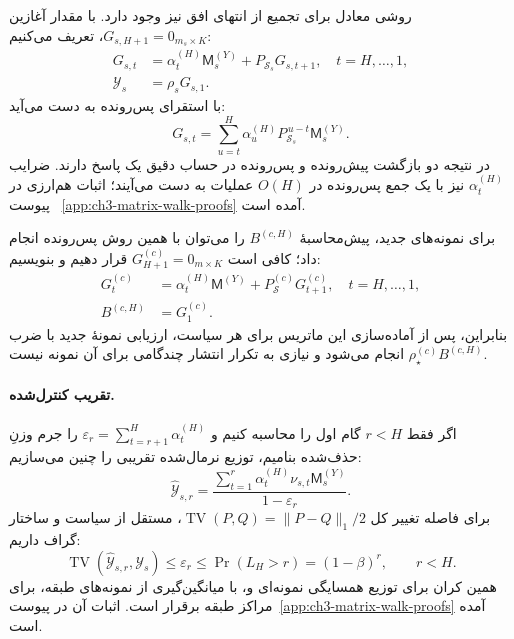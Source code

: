 روشی معادل برای تجمیع از انتهای
افق نیز وجود دارد. با مقدار آغازین
$G_{s,H+1}=0_{m_s\times K}$، تعریف می‌کنیم:
\begin{equation}\label{cmp:eq:ch3-matrix-backward-recursion}
\boxed{
\begin{aligned}
G_{s,t}
&=\alpha_t^{(H)}\mathsf M_s^{(Y)}
+P_{\mathcal S_s}G_{s,t+1},
\quad t=H,\ldots,1,\\
\mathscr Y_s&=\rho_sG_{s,1}.
\end{aligned}
}
\end{equation}
با استقرای پس‌رونده به دست می‌آید:
\[
G_{s,t}=\sum_{u=t}^{H}
\alpha_u^{(H)}P_{\mathcal S_s}^{\,u-t}
\mathsf M_s^{(Y)}.
\]
در نتیجه دو بازگشت پیش‌رونده و
پس‌رونده در حساب دقیق یک پاسخ دارند.
ضرایب $\alpha_t^{(H)}$ نیز با یک
جمع پس‌رونده در $O(H)$ عملیات به
دست می‌آیند؛ اثبات هم‌ارزی در پیوست~
\ref{app:ch3-matrix-walk-proofs} آمده است.

برای نمونه‌های جدید، پیش‌محاسبهٔ
$B^{(c,H)}$ را می‌توان با همین
روش پس‌رونده انجام داد؛ کافی است
$G_{H+1}^{(c)}=0_{m\times K}$
قرار دهیم و بنویسیم:
\begin{equation}\label{cmp:eq:ch3-new-sample-backward}
\boxed{
\begin{aligned}
G_t^{(c)}
&=\alpha_t^{(H)}\mathsf M^{(Y)}
+P_{\mathcal S}^{(c)}G_{t+1}^{(c)},
\quad t=H,\ldots,1,\\
B^{(c,H)}&=G_1^{(c)}.
\end{aligned}
}
\end{equation}
بنابراین، پس از آماده‌سازی این
ماتریس برای هر سیاست، ارزیابی
نمونهٔ جدید با ضرب
$\rho_\star^{(c)}B^{(c,H)}$
انجام می‌شود و نیازی به تکرار
انتشار چندگامی برای آن نمونه نیست.

\paragraph{تقریب کنترل‌شده.}
اگر فقط $r<H$ گام اول را محاسبه کنیم و
$\varepsilon_r=\sum_{t=r+1}^{H}\alpha_t^{(H)}$
را جرم وزنِ حذف‌شده بنامیم، توزیع نرمال‌شده تقریبی را چنین می‌سازیم:
\begin{equation}\label{cmp:eq:ch3-matrix-truncated}
\widehat{\mathscr Y}_{s,r}
=\frac{\sum_{t=1}^{r}\alpha_t^{(H)}
\nu_{s,t}\mathsf M_s^{(Y)}}{1-\varepsilon_r}.
\end{equation}
برای فاصله تغییر کل $\operatorname{TV}(P,Q)=\|P-Q\|_1/2$، مستقل از سیاست و ساختار گراف داریم:
\begin{equation}\label{cmp:eq:ch3-matrix-truncation-bound}
\boxed{\operatorname{TV}\!\left(
\widehat{\mathscr Y}_{s,r},\mathscr Y_s\right)
\le\varepsilon_r
\le\Pr(L_H>r)=(1-\beta)^r,\qquad r<H.}
\end{equation}
همین کران برای توزیع همسایگی نمونه‌ای و، با میانگین‌گیری از نمونه‌های طبقه، برای مراکز طبقه برقرار است. اثبات آن در پیوست~\ref{app:ch3-matrix-walk-proofs} آمده است.

